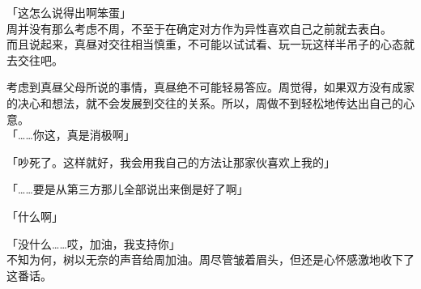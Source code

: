 「这怎么说得出啊笨蛋」\\

周并没有那么考虑不周，不至于在确定对方作为异性喜欢自己之前就去表白。\\

而且说起来，真昼对交往相当慎重，不可能以试试看、玩一玩这样半吊子的心态就去交往吧。

考虑到真昼父母所说的事情，真昼绝不可能轻易答应。周觉得，如果双方没有成家的决心和想法，就不会发展到交往的关系。所以，周做不到轻松地传达出自己的心意。\\

「……你这，真是消极啊」

「吵死了。这样就好，我会用我自己的方法让那家伙喜欢上我的」

「……要是从第三方那儿全部说出来倒是好了啊」

「什么啊」

「没什么……哎，加油，我支持你」\\

不知为何，树以无奈的声音给周加油。周尽管皱着眉头，但还是心怀感激地收下了这番话。
